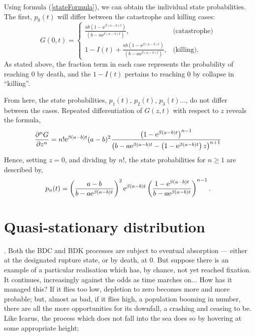 Using formula (\ref{stateFormula}), we can obtain the individual state probabilities. The first, $p_0(t)$ will differ between the catastrophe and killing cases: 
$$G(0 , t) = \begin{cases}
\frac{ab(1-\ee^{\beta(a-b) t})  } {  (b-a\ee^{\beta(a-b) t})   }, & \text{(catastrophe)}\\
1 - I(t) + \frac{ab(1-\ee^{\beta(a-b) t})  } {  (b-a\ee^{\beta(a-b) t})   }, & \text{(killing).}
\end{cases}$$
As stated above, the fraction term in each case represents the probability of reaching 0 by death, and the $1-I(t)$ pertains to reaching 0 by collapse in ``killing''.\par 
From here, the state probabilities, $p_1(t)$, $p_2(t)$, $p_3(t)\dots$, do not differ between the cases. Repeated differentiation of $G(z,t)$ with respect to $z$ reveals the formula,
$$\frac{\partial^n G}{\partial z^n} =n! {\rm e}^{\beta(a-b)t}(a-b)^2  \frac{\left(1-{\rm e}^{\beta(a-b)t}\right)^ {n-1} }{\left( b - a{\rm e}^{\beta(a-b)t} - \left(1-{\rm e}^{\beta(a-b)t}\right) z\right) ^ {n+1}} $$
Hence, setting $z=0$, and dividing by $n!$, the state probabilities for $n\geq1$ are described by,
\begin{equation}
\label{stateprob}
p_n(t) =\left( \frac{ a-b }{{b - a{\rm e}^{\beta(a-b)t}}}\right)^2 {\rm e}^{\beta(a-b)t} \left(\frac{{1-{\rm e}^{\beta(a-b)t}}}{{b - a{\rm e}^{\beta(a-b)t}} } \right)^{n-1}.
\end{equation} 

\section{Quasi-stationary distribution }

\cite{van2011quasi}.  Both the BDC and BDK processes are subject to eventual absorption --- either at the designated rupture state, or by death, at 0. But suppose there is an example of a particular realisation which has, by chance, not yet reached fixation. It continues, increasingly against the odds as time marches on... How has it managed this? If it flies too low, depletion to zero becomes more and more probable; but, almost as bad, if it flies high, a population booming in number, there are all the more opportunities for its downfall, a crashing and ceasing to be.
Like Icarus, the process which does not fall into the sea does so by hovering at some appropriate height; 

